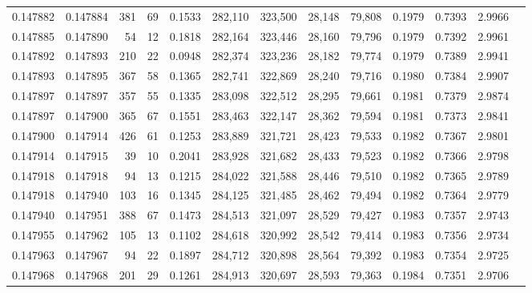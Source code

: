 \begin{tabular}{rrrrrrrrrrrrr}
0.147882 & 0.147884 &   381 &  69 &                                     0.1533 & 282,110 & 323,500 &  28,148 &  79,808 & 0.1979 & 0.7393 & 2.9966 \\
0.147885 & 0.147890 &    54 &  12 &                                     0.1818 & 282,164 & 323,446 &  28,160 &  79,796 & 0.1979 & 0.7392 & 2.9961 \\
0.147892 & 0.147893 &   210 &  22 &                                     0.0948 & 282,374 & 323,236 &  28,182 &  79,774 & 0.1979 & 0.7389 & 2.9941 \\
0.147893 & 0.147895 &   367 &  58 &                                     0.1365 & 282,741 & 322,869 &  28,240 &  79,716 & 0.1980 & 0.7384 & 2.9907 \\
0.147897 & 0.147897 &   357 &  55 &                                     0.1335 & 283,098 & 322,512 &  28,295 &  79,661 & 0.1981 & 0.7379 & 2.9874 \\
0.147897 & 0.147900 &   365 &  67 &                                     0.1551 & 283,463 & 322,147 &  28,362 &  79,594 & 0.1981 & 0.7373 & 2.9841 \\
0.147900 & 0.147914 &   426 &  61 &                                     0.1253 & 283,889 & 321,721 &  28,423 &  79,533 & 0.1982 & 0.7367 & 2.9801 \\
0.147914 & 0.147915 &    39 &  10 &                                     0.2041 & 283,928 & 321,682 &  28,433 &  79,523 & 0.1982 & 0.7366 & 2.9798 \\
0.147918 & 0.147918 &    94 &  13 &                                     0.1215 & 284,022 & 321,588 &  28,446 &  79,510 & 0.1982 & 0.7365 & 2.9789 \\
0.147918 & 0.147940 &   103 &  16 &                                     0.1345 & 284,125 & 321,485 &  28,462 &  79,494 & 0.1982 & 0.7364 & 2.9779 \\
0.147940 & 0.147951 &   388 &  67 &                                     0.1473 & 284,513 & 321,097 &  28,529 &  79,427 & 0.1983 & 0.7357 & 2.9743 \\
0.147955 & 0.147962 &   105 &  13 &                                     0.1102 & 284,618 & 320,992 &  28,542 &  79,414 & 0.1983 & 0.7356 & 2.9734 \\
0.147963 & 0.147967 &    94 &  22 &                                     0.1897 & 284,712 & 320,898 &  28,564 &  79,392 & 0.1983 & 0.7354 & 2.9725 \\
0.147968 & 0.147968 &   201 &  29 &                                     0.1261 & 284,913 & 320,697 &  28,593 &  79,363 & 0.1984 & 0.7351 & 2.9706 \\

\end{tabular}
